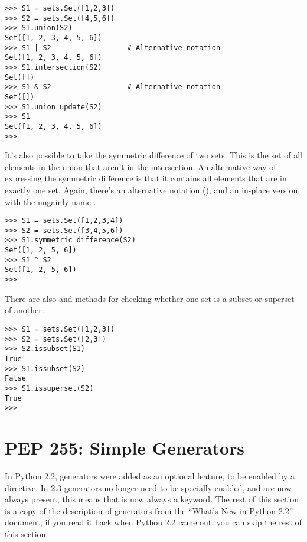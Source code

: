 \documentclass{howto}
\begin{document}
\begin{verbatim}
>>> S1 = sets.Set([1,2,3])
>>> S2 = sets.Set([4,5,6])
>>> S1.union(S2)
Set([1, 2, 3, 4, 5, 6])
>>> S1 | S2                  # Alternative notation
Set([1, 2, 3, 4, 5, 6])
>>> S1.intersection(S2)
Set([])
>>> S1 & S2                  # Alternative notation
Set([])
>>> S1.union_update(S2)
>>> S1
Set([1, 2, 3, 4, 5, 6])
>>>
\end{verbatim}

It's also possible to take the symmetric difference of two sets.  This
is the set of all elements in the union that aren't in the
intersection.  An alternative way of expressing the symmetric
difference is that it contains all elements that are in exactly one
set.  Again, there's an alternative notation (\code{\^}), and an
in-place version with the ungainly name
.

\begin{verbatim}
>>> S1 = sets.Set([1,2,3,4])
>>> S2 = sets.Set([3,4,5,6])
>>> S1.symmetric_difference(S2)
Set([1, 2, 5, 6])
>>> S1 ^ S2
Set([1, 2, 5, 6])
>>>
\end{verbatim}

There are also  and  methods
for checking whether one set is a subset or superset of another:

\begin{verbatim}
>>> S1 = sets.Set([1,2,3])
>>> S2 = sets.Set([2,3])
>>> S2.issubset(S1)
True
>>> S1.issubset(S2)
False
>>> S1.issuperset(S2)
True
>>>
\end{verbatim}


\begin{seealso}


\end{seealso}



\section{PEP 255: Simple Generators\label{section-generators}}

In Python 2.2, generators were added as an optional feature, to be
enabled by a  directive.  In
2.3 generators no longer need to be specially enabled, and are now
always present; this means that  is now always a
keyword.  The rest of this section is a copy of the description of
generators from the ``What's New in Python 2.2'' document; if you read
it back when Python 2.2 came out, you can skip the rest of this section.
\end{document}
